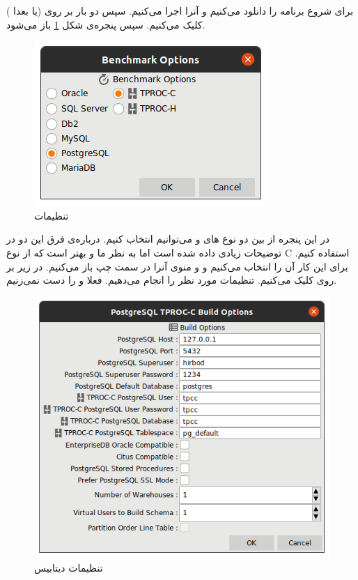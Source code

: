 برای شروع برنامه را دانلود می‌کنیم و آنرا اجرا می‌کنیم. سپس دو بار بر روی
 (یا بعدا )
کلیک می‌کنیم. سپس پنجره‌ی شکل
\ref{fig:hammerdb:init:benchmark_options}
باز می‌شود.
\begin{figure}[H]
    \centering
    \includegraphics[scale=0.5]{pictures/hammerdb/benchmark-options.png}
    \caption{تنظیمات }
    \label{fig:hammerdb:init:benchmark_options}
\end{figure}
در این پنجره از بین دو نوع
های
 و 
می‌توانیم انتخاب کنیم. درباره‌ی فرق این دو در
توضیحات زیادی داده شده است اما به نظر ما و
بهتر است که از نوع
C
استفاده کنیم. برای این کار آن را انتخاب می‌کنیم و و منوی آنرا در سمت چپ باز می‌کنیم.
در زیر
بر روی
کلیک می‌کنیم. تنظیمات مورد نظر را انجام می‌دهیم. فعلا
و
را دست نمی‌زنیم.
\begin{figure}[H]
    \centering
    \includegraphics[scale=0.4]{pictures/hammerdb/init.png}
    \caption{تنظیمات دیتابیس}
\end{figure}
